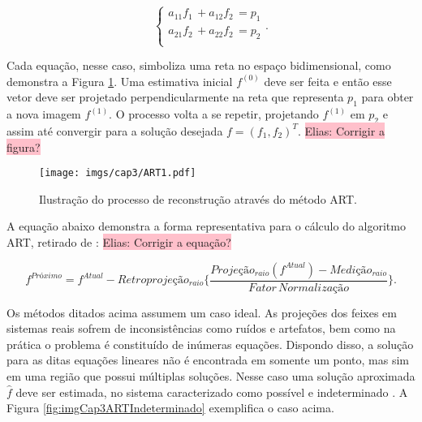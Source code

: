 {{\begin{equation}
\begin{cases}
a_{11}f_{1} \, + a_{12}f_{2} \, = p_{1} \\ 
a_{21}f_{2} \, + a_{22}f_{2} \, = p_{2} \\  
\end{cases}.
\label{eq:eqCap3ARTEquacoesLineares}
\end{equation}

Cada equação, nesse caso, simboliza uma reta no espaço bidimensional, como demonstra a Figura \ref{fig:imgCap3ART}. Uma estimativa inicial $f^{(0)}$ deve ser feita e então esse vetor deve ser projetado perpendicularmente na reta que representa $p_{1}$ para obter a nova imagem $f^{(1)}$. O processo volta a se repetir, projetando $f^{(1)}$ em $p_{2}$ e assim até convergir para a solução desejada $f = (f_{1},f_{2})^{T}$. \colorbox{pink}{Elias: Corrigir a figura?}


\begin{figure}[H]
	\caption{Ilustração do processo de reconstrução através do método \acs{ART}.}
	\begin{center}
		\texttt{[image: imgs/cap3/ART1.pdf]}
	\end{center}
	\label{fig:imgCap3ART}
\end{figure} 

A equação abaixo demonstra a forma representativa para o cálculo do algoritmo \acs{ART}, retirado de : \colorbox{pink}{Elias: Corrigir a equação?}

\begin{equation}
f^{Próximo} = f^{Atual} - Retroprojeção_{raio}\{\dfrac{Projeção_{raio}(f^{Atual})- Medição_{raio}}{Fator\,Normalização}\}.  
\label{eq:eqCap3ARTEquacoesSimbolica}
\end{equation}

Os métodos ditados acima assumem um caso ideal. As projeções dos feixes em sistemas reais sofrem de inconsistências como ruídos e artefatos, bem como na prática o problema é constituído de inúmeras equações. Dispondo disso, a solução para as ditas equações lineares não é encontrada em somente um ponto, mas sim em uma região que possui múltiplas soluções. Nesse caso uma solução aproximada $\hat{f}$ deve ser estimada, no sistema caracterizado como possível e indeterminado \cite[p. 218]{buzug2008computed}. A Figura \ref{fig:imgCap3ARTIndeterminado} exemplifica o caso acima. 

}}
